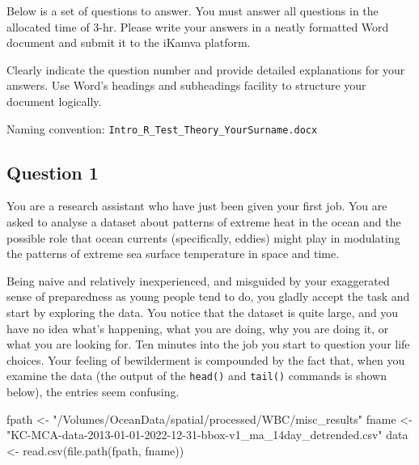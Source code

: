 \documentclass[
  10t,
]{article}
\newenvironment{Shaded}{\begin{snugshade}}{\end{snugshade}}
\newcommand{\FunctionTok}[1]{\textcolor[rgb]{0.28,0.35,0.67}{#1}}
\newcommand{\NormalTok}[1]{\textcolor[rgb]{0.00,0.23,0.31}{#1}}
\newcommand{\OtherTok}[1]{\textcolor[rgb]{0.00,0.23,0.31}{#1}}
\newcommand{\StringTok}[1]{\textcolor[rgb]{0.13,0.47,0.30}{#1}}
\begin{document}
Below is a set of questions to answer. You must answer all questions in
the allocated time of 3-hr. Please write your answers in a neatly
formatted Word document and submit it to the iKamva platform.

Clearly indicate the question number and provide detailed explanations
for your answers. Use Word's headings and subheadings facility to
structure your document logically.

Naming convention: \texttt{Intro\_R\_Test\_Theory\_YourSurname.docx}

\subsection{Question 1}\label{question-1}

You are a research assistant who have just been given your first job.
You are asked to analyse a dataset about patterns of extreme heat in the
ocean and the possible role that ocean currents (specifically, eddies)
might play in modulating the patterns of extreme sea surface temperature
in space and time.

Being naive and relatively inexperienced, and misguided by your
exaggerated sense of preparedness as young people tend to do, you gladly
accept the task and start by exploring the data. You notice that the
dataset is quite large, and you have no idea what's happening, what you
are doing, why you are doing it, or what you are looking for. Ten
minutes into the job you start to question your life choices. Your
feeling of bewilderment is compounded by the fact that, when you examine
the data (the output of the \texttt{head()} and \texttt{tail()} commands
is shown below), the entries seem confusing.

\begin{Shaded}
\begin{Highlighting}[]
\NormalTok{fpath }\OtherTok{\textless{}{-}} \StringTok{"/Volumes/OceanData/spatial/processed/WBC/misc\_results"}
\NormalTok{fname }\OtherTok{\textless{}{-}} \StringTok{"KC{-}MCA{-}data{-}2013{-}01{-}01{-}2022{-}12{-}31{-}bbox{-}v1\_ma\_14day\_detrended.csv"}
\NormalTok{data }\OtherTok{\textless{}{-}} \FunctionTok{read.csv}\NormalTok{(}\FunctionTok{file.path}\NormalTok{(fpath, fname))}
\end{Highlighting}
\end{Shaded}
\end{document}
